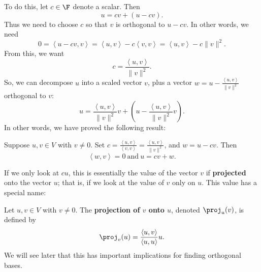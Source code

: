 \documentclass[math0540-lecture-notes.tex]{subfiles}
\begin{document}
To do this, let $c\in \F$ denote a scalar. Then \[
  u = cv+(u-cv)
.\] Thus we need to choose $c$ so that $v$ is orthogonal to $u-cv$. In other words, we need \[
  0 =\left<u-cv,v \right> =\left<u,v \right> - c\left<v,v \right> =\left<u,v \right>-c\|v\|^2
.\] From this, we want \[
  c = \frac{\left<u,v \right>}{\|v\|^2}
.\] So, we can decompose $u$ into a scaled vector $v$, plus a vector $w=u-\frac{\left<u,v
\right>}{\|v\|^2}$ orthogonal to $v$: \[
  u = \frac{\left<u,v \right>}{\|v\|^2}v+\left(u-\frac{\left<u,v \right>}{\|v\|^2}v\right)
.\] In other words, we have proved the following result:
\begin{proposition}{}
  Suppose $u,v\in V$ with $v\neq 0$. Set $c=\frac{\left<u,v \right>}{\left<v,v
  \right>}=\frac{\left<u,v \right>}{\|v\|^2}$, and $w=u-cv$. Then \[
    \left<w,v \right>=0 ~\text{and}~u=cv+w
  .\] 
\end{proposition}

If we only look at $cu$, this is essentially the value of the vector $v$ if \textbf{projected} onto
the vector $u$; that is, if we look at the value of $v$ only on $u$. This value has a special
name:
\begin{definition}[Projection]{}
  Let $u,v\in V$ with $v\neq 0$. The \textbf{projection of $v$ onto $u$}, denoted $\proj_{u}(v)$, is
  defined by \[
    \proj_{v}(u)=\frac{\left<u,v \right>}{\left<u,u \right>}u
  .\] We will see later that this has important implications for finding orthogonal bases.
\end{definition}
\end{document}
